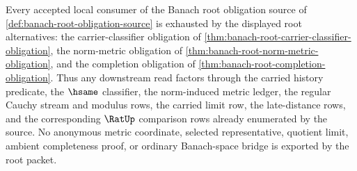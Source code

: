 \begin{theorem}
\label{thm:banach-root-downstream-coverage}
Every accepted local consumer of the Banach root obligation source of
\autoref{def:banach-root-obligation-source} is exhausted by the displayed root
alternatives: the carrier-classifier obligation of
\autoref{thm:banach-root-carrier-classifier-obligation}, the norm-metric
obligation of \autoref{thm:banach-root-norm-metric-obligation}, and the
completion obligation of \autoref{thm:banach-root-completion-obligation}. Thus
any downstream read factors through the carried history predicate, the
$\hsame$ classifier, the norm-induced metric ledger, the regular Cauchy
stream and modulus rows, the carried limit row, the late-distance rows, and
the corresponding $\RatUp$ comparison rows already enumerated by the source.
No anonymous metric coordinate, selected representative, quotient limit,
ambient completeness proof, or ordinary Banach-space bridge is exported by the
root packet.
\end{theorem}

